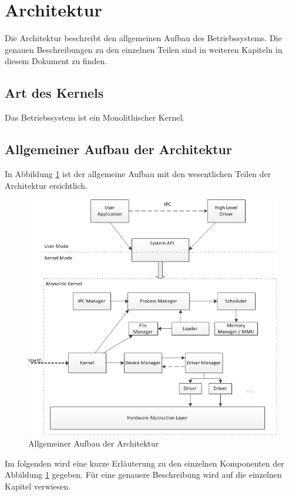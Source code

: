 \section{Architektur}
Die Architektur beschreibt den allgemeinen Aufbau des Betriebssystems. Die genauen Beschreibungen zu den einzelnen Teilen sind in weiteren Kapiteln in diesem Dokument zu finden.

\subsection{Art des Kernels}
Das Betriebssystem ist ein Monolithischer Kernel. 

\subsection{Allgemeiner Aufbau der Architektur}
In Abbildung \ref{fig:general-Architecture} ist der allgemeine Aufbau mit den wesentlichen Teilen der Architektur ersichtlich. 

\begin{figure}[H]
	\includegraphics[scale=0.9]{chapters/architecture/figures/architecture}
	\caption{Allgemeiner Aufbau der Architektur}
	\label{fig:general-Architecture}
\end{figure}

Im folgenden wird eine kurze Erläuterung zu den einzelnen Komponenten der Abbildung \ref{fig:general-Architecture} gegeben. Für eine genauere Beschreibung wird auf die einzelnen Kapitel verwiesen. \\

